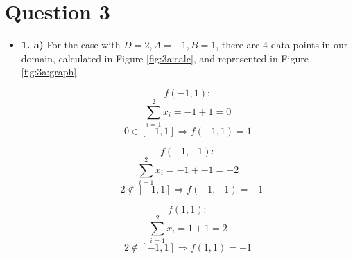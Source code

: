 \documentclass[12pt]{article}
\begin{document}
\section*{Question 3}
\begin{itemize}
    \item \textbf{1. a)} For the case with $D=2, A=-1, B=1$, there are 4 data points in our domain, calculated in Figure \ref{fig:3a:calc}, and represented in Figure \ref{fig:3a:graph}

        \begin{figure}[H]
            \begin{minipage}{0.5\linewidth}
                \begin{equation*}
                    f(-1, 1):
                \end{equation*}
                \begin{equation*}
                    \sum_{i=1}^{2} x_i = -1 + 1 = 0
                \end{equation*}
                \begin{equation*}
                    0 \in [-1, 1] \Rightarrow f(-1, 1) = 1
                \end{equation*}

                \begin{equation*}
                    f(-1, -1):
                \end{equation*}
                \begin{equation*}
                    \sum_{i=1}^{2} x_i = -1 + -1 = -2
                \end{equation*}
                \begin{equation*}
                    -2 \notin [-1, 1] \Rightarrow f(-1, -1) = -1
                \end{equation*}
            \end{minipage}
            \begin{minipage}{0.5\linewidth}
                \begin{equation*}
                    f(1, 1):
                \end{equation*}
                \begin{equation*}
                    \sum_{i=1}^{2} x_i = 1 + 1 = 2
                \end{equation*}
                \begin{equation*}
                    2 \notin [-1, 1] \Rightarrow f(1, 1) = -1
                \end{equation*}


\end{minipage}
\end{figure}
\end{itemize}
\end{document}
